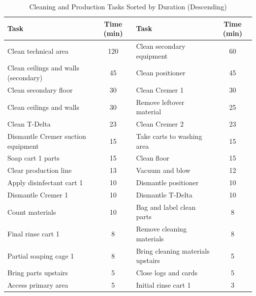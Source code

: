 \begin{table}[htbp]

\centering

\caption{Cleaning and Production Tasks Sorted by Duration (Descending)}

\begin{tabularx}{\textwidth}{l c l c}

\toprule

\textbf{Task} & \textbf{Time (min)} & \textbf{Task} & \textbf{Time (min)} \\

\midrule

Clean technical area & 120 & Clean secondary equipment & 60 \\

Clean ceilings and walls (secondary) & 45 & Clean positioner & 45 \\

Clean secondary floor & 30 & Clean Cremer 1 & 30 \\

Clean ceilings and walls & 30 & Remove leftover material & 25 \\

Clean T-Delta & 23 & Clean Cremer 2 & 23 \\

Dismantle Cremer suction equipment & 15 & Take carts to washing area & 15 \\

Soap cart 1 parts & 15 & Clean floor & 15 \\

Clear production line & 13 & Vacuum and blow & 12 \\

Apply disinfectant cart 1 & 10 & Dismantle positioner & 10 \\

Dismantle Cremer 1 & 10 & Dismantle T-Delta & 10 \\

Count materials & 10 & Bag and label clean parts & 8 \\

Final rinse cart 1 & 8 & Remove cleaning materials & 8 \\

Partial soaping cage 1 & 8 & Bring cleaning materials upstairs & 5 \\

Bring parts upstairs & 5 & Close logs and cards & 5 \\

Access primary area & 5 & Initial rinse cart 1 & 3 \\


\end{tabularx}
\end{table}
